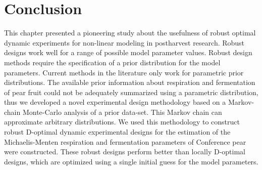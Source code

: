 \section{Conclusion}
This chapter presented a pioneering study about the usefulness of robust optimal dynamic experiments for non-linear modeling in postharvest research. Robust designs work well for a range of possible model parameter values. Robust design methods require the specification of a prior distribution for the model parameters. Current methods in the literature only work for parametric prior distributions. The available prior information about respiration and fermentation of pear fruit could not be adequately summarized using a parametric distribution, thus we developed a novel experimental design methodology based on a Markov-chain Monte-Carlo analysis of a prior data-set. This Markov chain can approximate arbitrary distributions. We used this methodology to construct robust D-optimal dynamic experimental designs for the estimation of the Michaelis-Menten respiration and fermentation parameters of Conference pear were constructed. These robust designs perform better than locally D-optimal designs, which are optimized using a single initial guess for the model parameters.